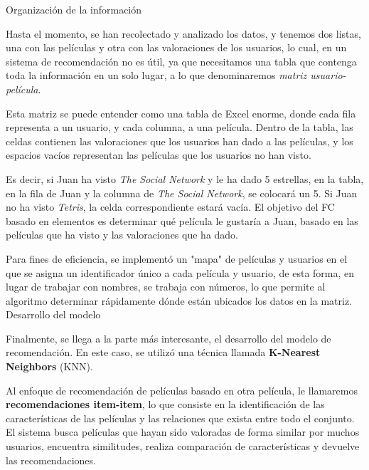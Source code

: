 \documentclass[letterpaper,10pt,final,hyphenatedtitles]{papertexKS}
\begin{document}
\begin{news}{2}
	\begin{center}
	\end{center}

	\noindent\textcolor{color}{\Large{Organización de la información}}

	Hasta el momento, se han recolectado y analizado los datos, y tenemos dos listas, una con las películas y otra con las valoraciones de los usuarios, lo cual, en un sistema de recomendación no es útil, ya que necesitamos una tabla que contenga toda la información en un solo lugar, a lo que denominaremos \textit{matriz usuario-película}.

	Esta matriz se puede entender como una tabla de Excel enorme, donde cada fila representa a un usuario, y cada columna, a una película. Dentro de la tabla, las celdas contienen las valoraciones que los usuarios han dado a las películas, y los espacios vacíos representan las películas que los usuarios no han visto.

	Es decir, si Juan ha visto \textit{The Social Network} y le ha dado 5 estrellas, en la tabla, en la fila de Juan y la columna de \textit{The Social Network}, se colocará un 5. Si Juan no ha visto \textit{Tetris}, la celda correspondiente estará vacía. El objetivo del FC basado en elementos es determinar qué película le gustaría a Juan, basado en las películas que ha visto y las valoraciones que ha dado.

	Para fines de eficiencia, se implementó un "mapa" de películas y usuarios en el que se asigna un identificador único a cada película y usuario, de esta forma, en lugar de trabajar con nombres, se trabaja con números, lo que permite al algoritmo determinar rápidamente dónde están ubicados los datos en la matriz.
	\\ 

    \noindent\textcolor{color}{\Large{Desarrollo del modelo}}

    Finalmente, se llega a la parte más interesante, el desarrollo del modelo de recomendación. En este caso, se utilizó una técnica llamada \textbf{K-Nearest Neighbors} (KNN). 

	Al enfoque de recomendación de películas basado en otra película, le llamaremos \textbf{recomendaciones item-item}, lo que consiste en la identificación de las características de las películas y las relaciones que exista entre todo el conjunto. El sistema busca películas que hayan sido valoradas de forma similar por muchos usuarios, encuentra similitudes, realiza comparación de características y devuelve las recomendaciones.


\end{news}
\end{document}
